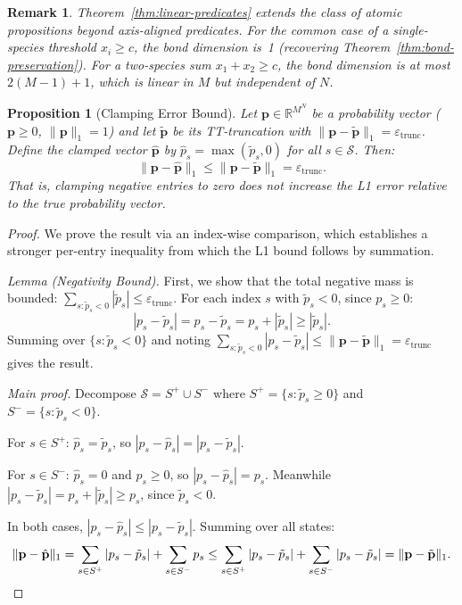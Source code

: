 \documentclass[11pt]{article}
\newtheorem{proposition}[theorem]{Proposition}
\newtheorem{remark}[theorem]{Remark}
\newcommand{\norm}[1]{\lVert #1 \rVert}
\newcommand{\R}{\mathbb{R}}
\newcommand{\eps}{\varepsilon}
\newcommand{\calS}{\mathcal{S}}
\begin{document}
\begin{remark}
Theorem~\ref{thm:linear-predicates} extends the class of atomic
propositions beyond axis-aligned predicates.
For the common case of a single-species threshold $x_i \geq c$, the
bond dimension is~1 (recovering Theorem~\ref{thm:bond-preservation}).
For a two-species sum $x_1 + x_2 \geq c$, the bond dimension is at
most $2(M-1)+1$, which is linear in $M$ but independent of $N$.
\end{remark}

\begin{proposition}[Clamping Error Bound]\label{prop:clamp}
Let $\mathbf{p} \in \R^{M^N}$ be a probability vector
($\mathbf{p} \geq 0$, $\norm{\mathbf{p}}_1 = 1$) and let
$\tilde{\mathbf{p}}$ be its TT-truncation with
$\norm{\mathbf{p} - \tilde{\mathbf{p}}}_1 = \eps_{\mathrm{trunc}}$.
Define the clamped vector $\hat{\mathbf{p}}$ by
$\hat{p}_s = \max(\tilde{p}_s, 0)$ for all $s \in \calS$.
Then:
\begin{equation}\label{eq:clamp}
  \norm{\mathbf{p} - \hat{\mathbf{p}}}_1
  \leq \norm{\mathbf{p} - \tilde{\mathbf{p}}}_1
  = \eps_{\mathrm{trunc}}.
\end{equation}
That is, clamping negative entries to zero does not increase the
L1 error relative to the true probability vector.
\end{proposition}

\begin{proof}
We prove the result via an index-wise comparison, which establishes
a stronger per-entry inequality from which the L1 bound follows by summation.

\emph{Lemma (Negativity Bound).}
First, we show that the total negative mass is bounded:
$\sum_{s:\tilde{p}_s < 0} |\tilde{p}_s| \leq \eps_{\mathrm{trunc}}$.
For each index $s$ with $\tilde{p}_s < 0$, since $p_s \geq 0$:
\[
  |p_s - \tilde{p}_s| = p_s - \tilde{p}_s = p_s + |\tilde{p}_s| \geq |\tilde{p}_s|.
\]
Summing over $\{s : \tilde{p}_s < 0\}$ and noting
$\sum_{s:\tilde{p}_s<0} |p_s - \tilde{p}_s| \leq \norm{\mathbf{p} - \tilde{\mathbf{p}}}_1 = \eps_{\mathrm{trunc}}$
gives the result.

\emph{Main proof.}
Decompose $\calS = S^+ \cup S^-$ where $S^+ = \{s : \tilde{p}_s \geq 0\}$
and $S^- = \{s : \tilde{p}_s < 0\}$.

For $s \in S^+$: $\hat{p}_s = \tilde{p}_s$, so
$|p_s - \hat{p}_s| = |p_s - \tilde{p}_s|$.

For $s \in S^-$: $\hat{p}_s = 0$ and $p_s \geq 0$, so
$|p_s - \hat{p}_s| = p_s$.
Meanwhile $|p_s - \tilde{p}_s| = p_s + |\tilde{p}_s| \geq p_s$,
since $\tilde{p}_s < 0$.

In both cases, $|p_s - \hat{p}_s| \leq |p_s - \tilde{p}_s|$.
Summing over all states:
\[
  \norm{\mathbf{p} - \hat{\mathbf{p}}}_1
  = \sum_{s \in S^+} |p_s - \tilde{p}_s|
    + \sum_{s \in S^-} p_s
  \leq \sum_{s \in S^+} |p_s - \tilde{p}_s|
    + \sum_{s \in S^-} |p_s - \tilde{p}_s|
  = \norm{\mathbf{p} - \tilde{\mathbf{p}}}_1.\qedhere
\]
\end{proof}
\end{document}
